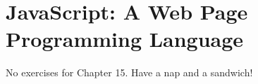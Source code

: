 \chapter{JavaScript: A Web Page Programming Language}


\begin{exercises}
No exercises for Chapter 15. Have a nap and a sandwich!
\end{exercises}
